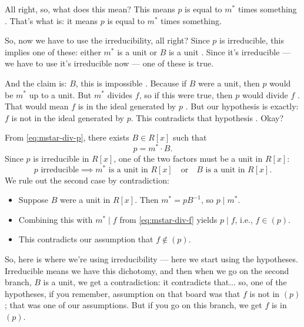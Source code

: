 \begin{proofWrapper}
\begin{speech}[00:31:57 - 00:33:18]
All right, so, what does this mean? This means $p$ is equal to $m^*$ times something . That's what  is: it means $p$ is equal to $m^*$ times something.

So, now we have to use the irreducibility, all right? Since $p$ is irreducible, this implies one of these: either $m^*$ is a unit or $B$ is a unit . Since it's irreducible --- we have to use it's irreducible now --- one of these is true.

And the claim is: $B$, this is impossible . Because if $B$ were a unit, then $p$ would be $m^*$ up to a unit. But $m^*$ divides $f$, so if this were true, then $p$ would divide $f$ . That would mean $f$ is in the ideal generated by $p$ . But our hypothesis is exactly: $f$ is not in the ideal generated by $p$. This contradicts that hypothesis . Okay?
\end{speech}

\begin{content}
From \eqref{eq:mstar-div-p}, there exists $B \in R[x]$ such that
\begin{equation}\label{eq:p-mstar-B}
p = m^* \cdot B.
\end{equation}
Since $p$ is irreducible in $R[x]$, one of the two factors must be a unit in $R[x]$:
\[
p \text{ irreducible} \implies m^* \text{ is a unit in } R[x] \quad \text{or} \quad B \text{ is a unit in } R[x].
\]
We rule out the second case by contradiction:
\begin{itemize}
    \item Suppose $B$ were a unit in $R[x]$. Then $m^* = p B^{-1}$, so $p \mid m^*$.
    \item Combining this with $m^* \mid f$ from \eqref{eq:mstar-div-f} yields $p \mid f$, i.e., $f \in (p)$.
    \item This contradicts our assumption that $f \notin (p)$.
\end{itemize}
\end{content}

\begin{speech}[00:33:18 - 00:34:35]
So, here is where we're using irreducibility --- here we start using the hypotheses. Irreducible means we have this dichotomy, and then when we go on the second branch, $B$ is a unit, we get a contradiction: it contradicts that... so, one of the hypotheses, if you remember, assumption on that board  was that $f$ is not in $(p)$ ; that was one of our assumptions. But if you go on this branch, we get $f$ is in $(p)$.


\end{speech}
\end{proofWrapper}
